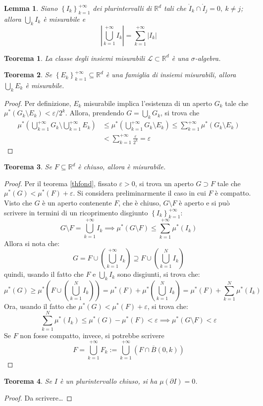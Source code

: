\documentclass[11pt]{article}
\theoremstyle{style}
\newtheorem{teorema}{Teorema}[section]
\newtheorem{lemma}{Lemma}[teorema]
\numberwithin{equation}{subsection}
\begin{document}
\begin{lemma}
	Siano $\left\{ I_k \right\} _{k=1} ^{+\infty} $ dei plurintervalli di $\mathbb{R}^d$ tali che $\mathring{I}_k \cap \mathring{I}_j = 0, \ k\neq j$; allora $\bigcup_k I_k$ \`e misurabile e 
	\[
 \left\lvert \bigcup_{k=1} ^{+\infty} I_k \right\rvert = \sum_{k=1}^{+\infty} \lvert I_k \rvert 
	\] 
\end{lemma}
\begin{teorema}
	La classe degli insiemi misurabili $\mathscr{L} \subset \mathbb{R}^d$ \`e una $\sigma $-algebra.
\end{teorema}
\begin{teorema}
	Se $\left\{ E_k \right\} _{k=1} ^{+\infty} \subseteq \mathbb{R}^d$ \`e una famiglia di insiemi misurabili, allora $\bigcup_k E_k$ \`e misurabile.
\end{teorema}
\begin{proof}
	Per definizione, $E_k$ misurabile implica l'esistenza di un aperto $G_k$ tale che $\mu^* ( G_k \setminus E_k )< \varepsilon / 2^k$.
	Allora, prendendo $G= \bigcup_k G_k$, si trova che
	\[
		\begin{split}
			\mu^*  \left(\bigcup_{k=1}^{+\infty}   G_k \setminus \bigcup_{k=1}^{+\infty}   E_k\right)   &\le \mu^* \left(\bigcup_{k=1}^{+\infty}   G_k \setminus E_k\right) \le \sum_{k=1}^{+\infty} \mu^* (G_k\setminus E_k) \\
														  &< \sum_{k=1}^{+\infty} \frac{\varepsilon}{2^k} = \varepsilon 
		\end{split}
	\] 
\end{proof}
\begin{teorema}
	Se $F\subseteq \mathbb{R}^d$ \`e chiuso, allora \`e misurabile.
\end{teorema}
	\begin{proof}
		Per il teorema \ref{thfond}, fissato $\varepsilon >0$, si trova un aperto $G \supset F$ tale che $\mu ^*(G)< \mu ^*(F) + \varepsilon $.
		Si considera preliminarmente il caso in cui $F$ \`e compatto.
	Visto che $G$ \`e un aperto contenente $F$, che \`e chiuso, $G \setminus F$ \`e aperto e si pu\`o scrivere in termini di un ricoprimento disgiunto $\left\{ I_k \right\} _{k=1} ^{+\infty} $:
		\[
		G \setminus F = \bigcup_{k=1} ^{+\infty} I_k \implies \mu ^*(G\setminus F) \le  \sum_{k=1}^{+\infty} \mu^* (I_k)
		\] 
		Allora si nota che:
		\[
		G = F \cup \left(\bigcup_{k=1} ^{+\infty} I_k\right) \supseteq F \cup \left(\bigcup_{k=1} ^N I_k\right) 
		\] 
		quindi, usando il fatto che $F$ e $\bigcup_{k} I_k$ sono disgiunti, si trova che:
		\[
		\mu^* (G) \ge \mu ^*\left( F \cup \left(\bigcup_{k=1} ^{N} I_k\right)  \right) = \mu ^*(F) + \mu ^*\left(\bigcup_{k=1} ^N I_k\right)  = \mu ^*(F) + \sum_{k=1}^{N} \mu ^*(I_k)
		\] 
		Ora, usando il fatto che $\mu ^*(G) < \mu ^*(F) + \varepsilon $, si trova che:
		\[
		\sum_{k=1}^{N} \mu ^*(I_k) \le  \mu ^*(G) - \mu ^*(F) < \varepsilon  \implies \mu ^*(G\setminus F) < \varepsilon 
		\] 
		Se $F$ non fosse compatto, invece, si potrebbe scrivere
		\[
			F = \bigcup _{k=1} ^{+\infty} F_k := \bigcup_{k=1} ^{+\infty} \left(F \cap \overline{B}(0,k)\right) 
		\] 
	\end{proof}
\begin{teorema}
	Se $I$ \`e un plurintervallo chiuso, si ha $\mu (\partial I) = 0$.
\end{teorema}
\begin{proof}
	Da scrivere\ldots
\end{proof}
\end{document}
